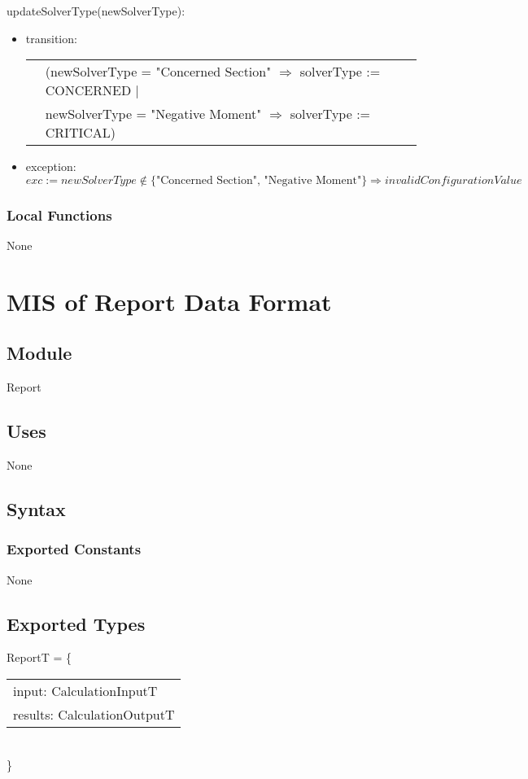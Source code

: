 \documentclass[12pt, titlepage]{article}
\begin{document}
\noindent updateSolverType(newSolverType):
\begin{itemize}
\item transition:\\
\begin{tabular}{p{1cm} p{16cm}}
& (newSolverType = "Concerned Section" $\Rightarrow$ solverType := CONCERNED $|$\\
& newSolverType = "Negative Moment" $\Rightarrow$ solverType := CRITICAL)\\
\end{tabular}
\item exception: $exc := newSolverType \notin \{\text{"Concerned Section", "Negative Moment"}\} \Rightarrow invalidConfigurationValue$
\end{itemize}

\subsubsection{Local Functions}
None
\newpage

\section{MIS of Report Data Format} \label{Report} 

\subsection{Module}

Report

\subsection{Uses}
None

\subsection{Syntax}

\subsubsection{Exported Constants}
None
\subsection{Exported Types}
ReportT = \{\\
    \begin{tabular}{l}
	input: CalculationInputT\\
    results: CalculationOutputT\\
    \end{tabular}
\\\}
\end{document}

